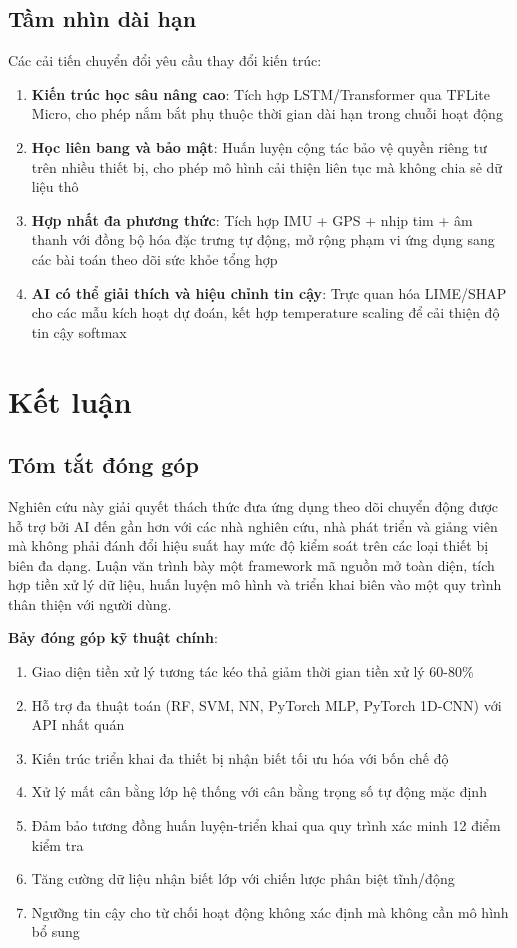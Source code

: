 \subsection{Tầm nhìn dài hạn}
Các cải tiến chuyển đổi yêu cầu thay đổi kiến trúc:
\begin{enumerate}
    \item \textbf{Kiến trúc học sâu nâng cao}: Tích hợp LSTM/Transformer qua TFLite Micro, cho phép nắm bắt phụ thuộc thời gian dài hạn trong chuỗi hoạt động
    \item \textbf{Học liên bang và bảo mật}: Huấn luyện cộng tác bảo vệ quyền riêng tư trên nhiều thiết bị, cho phép mô hình cải thiện liên tục mà không chia sẻ dữ liệu thô
    \item \textbf{Hợp nhất đa phương thức}: Tích hợp IMU + GPS + nhịp tim + âm thanh với đồng bộ hóa đặc trưng tự động, mở rộng phạm vi ứng dụng sang các bài toán theo dõi sức khỏe tổng hợp
    \item \textbf{AI có thể giải thích và hiệu chỉnh tin cậy}: Trực quan hóa LIME/SHAP cho các mẫu kích hoạt dự đoán, kết hợp temperature scaling để cải thiện độ tin cậy softmax
\end{enumerate}

\section{Kết luận}

\subsection{Tóm tắt đóng góp}
Nghiên cứu này giải quyết thách thức đưa ứng dụng theo dõi chuyển động được hỗ trợ bởi AI đến gần hơn với các nhà nghiên cứu, nhà phát triển và giảng viên mà không phải đánh đổi hiệu suất hay mức độ kiểm soát trên các loại thiết bị biên đa dạng. Luận văn trình bày một framework mã nguồn mở toàn diện, tích hợp tiền xử lý dữ liệu, huấn luyện mô hình và triển khai biên vào một quy trình thân thiện với người dùng.

\textbf{Bảy đóng góp kỹ thuật chính}:
\begin{enumerate}
    \item Giao diện tiền xử lý tương tác kéo thả giảm thời gian tiền xử lý 60-80\%
    \item Hỗ trợ đa thuật toán (RF, SVM, NN, PyTorch MLP, PyTorch 1D-CNN) với API nhất quán
    \item Kiến trúc triển khai đa thiết bị nhận biết tối ưu hóa với bốn chế độ
    \item Xử lý mất cân bằng lớp hệ thống với cân bằng trọng số tự động mặc định
    \item Đảm bảo tương đồng huấn luyện-triển khai qua quy trình xác minh 12 điểm kiểm tra
    \item Tăng cường dữ liệu nhận biết lớp với chiến lược phân biệt tĩnh/động
    \item Ngưỡng tin cậy cho từ chối hoạt động không xác định mà không cần mô hình bổ sung
\end{enumerate}

